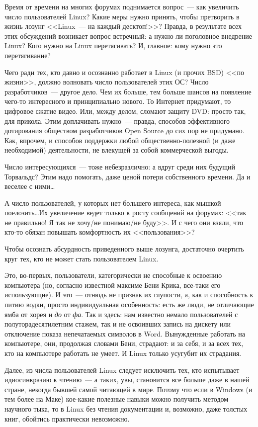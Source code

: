Время от времени на многих форумах поднимается вопрос~--- как увеличить число пользователей Linux? Какие меры нужно принять, чтобы претворить в жизнь лозунг <<Linux~--- на каждый десктоп!>>? Правда, в результате всех этих обсуждений возникает вопрос встречный: а нужно ли поголовное внедрение Linux? Кого нужно на Linux перетягивать? И, главное: кому нужно это перетягивание?

Чего ради тех, кто давно и осознанно работает в Linux (и прочих BSD) <<по жизни>>, должно волновать число пользователей этих ОС? Число разработчиков~--- другое дело. Чем их больше, тем больше шансов на появление чего-то интересного и принципиально нового. То Интернет придумают, то цифровое сжатие видео. Или, между делом, сломают защиту DVD: просто так, для прикола. Этим доплачивать нужно~--- правда, способов эффективного дотирования обществом разработчиков Open Source до сих пор не придумано. Как, впрочем, и способов поддержки любой общественно-полезной (и даже необходимой) деятельности, не влекущей за собой коммерческой выгоды.

Число интересующихся~--- тоже небезразлично: а вдруг среди них будущий Торвальдс? Этим надо помогать, даже ценой потери собственного времени. Да и веселее с ними\dots

А число пользователей, у которых нет большего интереса, как мышкой поелозить\dots Их увеличение ведет только к росту сообщений на форумах: <<так не правильно! Я так не хочу/не понимаю/не буду>>. И с чего они взяли, что кто-то обязан повышать комфортность их <<пользования>>?

Чтобы осознать абсурдность приведенного выше лозунга, достаточно очертить круг тех, кто не может стать пользователем Linux.

Это, во-первых, пользователи, категорически не способные к освоению компьютера (но, согласно известной максиме Бени Крика, все-таки его использующие). И это~--- отнюдь не признак их глупости, а, как и способность к питию водки, просто индивидуальная особенность: есть же люди, не отличающие ямба от хорея и \textit{до} от \textit{фа}. Так и здесь: нам известно немало пользователей с полуторадесятилетним стажем, так и не освоивших запись на дискету или отключение показа непечатаемых символов в Word. Вынужденные работать на компьютере, они, продолжая словами Бени, страдают: и за себя, и за всех тех, кто на компьютере работать не умеет. И Linux только усугубит их страдания.

Далее, из числа пользователей Linux следует исключить тех, кто испытывает идиосинкразию к чтению~--- а таких, увы, становится все больше даже в нашей стране, некогда бывшей самой читающей в мире. Потому что если в Windows (и тем более на Маке) кое-какие полезные навыки можно получить методом научного тыка, то в Linux без чтения документации и, возможно, даже толстых книг, обойтись практически невозможно.

